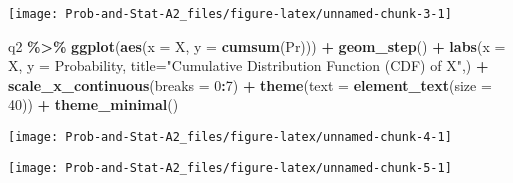 \documentclass[
]{article}
\newenvironment{Shaded}{\begin{snugshade}}{\end{snugshade}}
\newcommand{\AttributeTok}[1]{\textcolor[rgb]{0.13,0.29,0.53}{#1}}
\newcommand{\CommentTok}[1]{\textcolor[rgb]{0.56,0.35,0.01}{\textit{#1}}}
\newcommand{\DecValTok}[1]{\textcolor[rgb]{0.00,0.00,0.81}{#1}}
\newcommand{\FunctionTok}[1]{\textcolor[rgb]{0.13,0.29,0.53}{\textbf{#1}}}
\newcommand{\NormalTok}[1]{#1}
\newcommand{\OtherTok}[1]{\textcolor[rgb]{0.56,0.35,0.01}{#1}}
\newcommand{\SpecialCharTok}[1]{\textcolor[rgb]{0.81,0.36,0.00}{\textbf{#1}}}
\newcommand{\StringTok}[1]{\textcolor[rgb]{0.31,0.60,0.02}{#1}}
\begin{document}
\begin{center}\texttt{[image: Prob-and-Stat-A2\_files/figure-latex/unnamed-chunk-3-1]} \end{center}

\begin{Shaded}
\begin{Highlighting}[]
\NormalTok{q2 }\SpecialCharTok{\%\textgreater{}\%}
  \FunctionTok{ggplot}\NormalTok{(}\FunctionTok{aes}\NormalTok{(}\AttributeTok{x =}\NormalTok{ X, }\AttributeTok{y =} \FunctionTok{cumsum}\NormalTok{(Pr))) }\SpecialCharTok{+}
  \FunctionTok{geom\_step}\NormalTok{() }\SpecialCharTok{+} 
  \FunctionTok{labs}\NormalTok{(}\AttributeTok{x =} \StringTok{\textquotesingle{}X\textquotesingle{}}\NormalTok{,}
       \AttributeTok{y =} \StringTok{\textquotesingle{}Probability\textquotesingle{}}\NormalTok{,}
       \AttributeTok{title=}\StringTok{"Cumulative Distribution Function (CDF) of X"}\NormalTok{,) }\SpecialCharTok{+}
  \FunctionTok{scale\_x\_continuous}\NormalTok{(}\AttributeTok{breaks =} \DecValTok{0}\SpecialCharTok{:}\DecValTok{7}\NormalTok{) }\SpecialCharTok{+}
  \FunctionTok{theme}\NormalTok{(}\AttributeTok{text =} \FunctionTok{element\_text}\NormalTok{(}\AttributeTok{size =} \DecValTok{40}\NormalTok{)) }\SpecialCharTok{+}
  \FunctionTok{theme\_minimal}\NormalTok{()}
\end{Highlighting}
\end{Shaded}

\begin{center}\texttt{[image: Prob-and-Stat-A2\_files/figure-latex/unnamed-chunk-4-1]} \end{center}

\begin{Shaded}
\end{Shaded}

\begin{center}\texttt{[image: Prob-and-Stat-A2\_files/figure-latex/unnamed-chunk-5-1]} \end{center}
\end{document}
